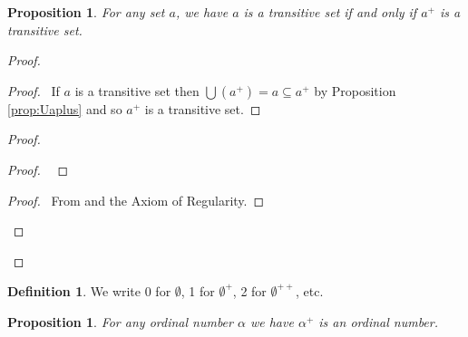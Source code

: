 \documentclass{book}
\let\qed\relax
\newtheorem{prop}[ax]{Proposition}
\theoremstyle{definition}
\newtheorem{df}[ax]{Definition}
\begin{document}
\begin{prop}
\label{prop:successortransitive}
For any set $a$, we have $a$ is a transitive set if and only if $a^+$ is a transitive set.
\end{prop}

\begin{proof}
\pf
{}
\begin{proof}
	\pf\ If $a$ is a transitive set then $\bigcup(a^+) = a \subseteq a^+$ by Proposition \ref{prop:Uaplus} and so $a^+$ is a transitive set.
\end{proof}
\begin{proof}
	\begin{proof}
		\pf\ 
	\end{proof}
	\begin{proof}
		\pf\ From  and the Axiom of Regularity.
	\end{proof}
\end{proof}
\qed
\end{proof}

\begin{df}
We write 0 for $\emptyset$, 1 for $\emptyset^+$, 2 for $\emptyset^{++}$, etc.
\end{df}

\begin{prop}
For any ordinal number $\alpha$ we have $\alpha^+$ is an ordinal number.
\end{prop}
\end{document}
